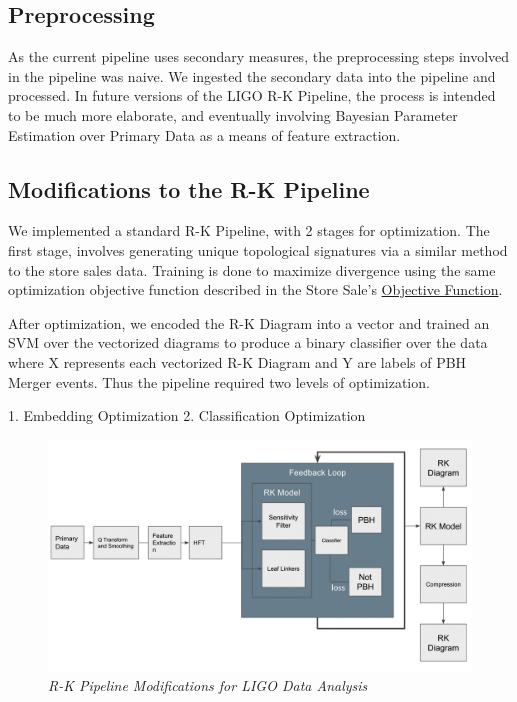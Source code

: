     \subsection{Preprocessing}

    As the current pipeline uses secondary measures, the preprocessing steps involved in the pipeline was naive. We ingested the secondary data into the pipeline and processed. In future versions of the LIGO R-K Pipeline, the process is intended to be much more elaborate, and eventually involving Bayesian Parameter Estimation over Primary Data as a means of feature extraction.

    \subsection{Modifications to the R-K Pipeline}

    We implemented a standard R-K Pipeline, with 2 stages for optimization. The first stage, involves generating unique topological signatures via a similar method to the store sales data. Training is done to maximize divergence using the same optimization objective function described in the Store Sale's \hyperref[sec:ObjectiveFunction]{Objective Function}.

    After optimization, we encoded the R-K Diagram into a vector and trained an SVM over the vectorized diagrams to produce a binary classifier over the data where X represents each vectorized R-K Diagram and Y are labels of PBH Merger events. Thus the pipeline required two levels of optimization.

    1. Embedding Optimization
    2. Classification Optimization

    \begin{figure}[H]
        \centering
        \includegraphics[width=1.0\linewidth]{images/ligo_pipeline.jpg}
        \caption{\textit{R-K Pipeline Modifications for LIGO Data Analysis}}
        \label{fig:ligo_pipeline_fig}
    \end{figure}

